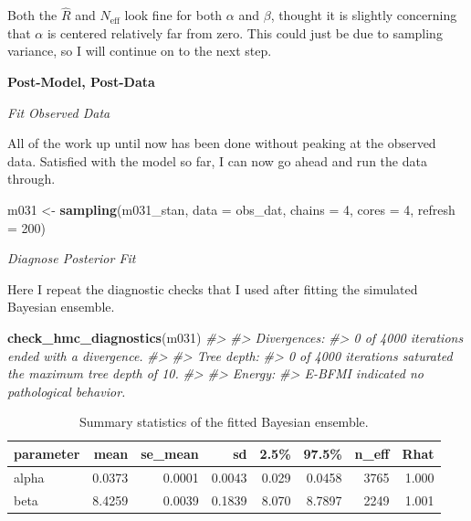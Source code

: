 \documentclass[11pt, oneside, openany]{scrbook}
\newenvironment{Shaded}{\begin{snugshade}}{\end{snugshade}}
\newcommand{\CommentTok}[1]{\textcolor[rgb]{0.56,0.35,0.01}{\textit{#1}}}
\newcommand{\DataTypeTok}[1]{\textcolor[rgb]{0.13,0.29,0.53}{#1}}
\newcommand{\DecValTok}[1]{\textcolor[rgb]{0.00,0.00,0.81}{#1}}
\newcommand{\KeywordTok}[1]{\textcolor[rgb]{0.13,0.29,0.53}{\textbf{#1}}}
\newcommand{\NormalTok}[1]{#1}
\newcommand{\StringTok}[1]{\textcolor[rgb]{0.31,0.60,0.02}{#1}}
\begin{document}
Both the \(\hat{R}\) and \(N_{\mathrm{eff}}\) look fine for both \(\alpha\) and \(\beta\), thought it is slightly concerning that \(\alpha\) is centered relatively far from zero. This could just be due to sampling variance, so I will continue on to the next step.

\textbf{Post-Model, Post-Data}

\emph{Fit Observed Data}

All of the work up until now has been done without peaking at the observed data. Satisfied with the model so far, I can now go ahead and run the data through.


\begin{Shaded}
\begin{Highlighting}[]
\NormalTok{m031 <-}\StringTok{ }\KeywordTok{sampling}\NormalTok{(m031_stan, }\DataTypeTok{data =}\NormalTok{ obs_dat, }
                 \DataTypeTok{chains =} \DecValTok{4}\NormalTok{, }\DataTypeTok{cores =} \DecValTok{4}\NormalTok{, }\DataTypeTok{refresh =} \DecValTok{200}\NormalTok{)}
\end{Highlighting}
\end{Shaded}


\emph{Diagnose Posterior Fit}

Here I repeat the diagnostic checks that I used after fitting the simulated Bayesian ensemble.


\begin{Shaded}
\begin{Highlighting}[]
\KeywordTok{check_hmc_diagnostics}\NormalTok{(m031)}
\CommentTok{#> }
\CommentTok{#> Divergences:}
\CommentTok{#> 0 of 4000 iterations ended with a divergence.}
\CommentTok{#> }
\CommentTok{#> Tree depth:}
\CommentTok{#> 0 of 4000 iterations saturated the maximum tree depth of 10.}
\CommentTok{#> }
\CommentTok{#> Energy:}
\CommentTok{#> E-BFMI indicated no pathological behavior.}
\end{Highlighting}
\end{Shaded}


\begin{table}[!h]

\caption{\label{tab:ch031-Maroon-Oyster}Summary statistics of the fitted Bayesian ensemble.}
\centering
\begin{tabular}[t]{lrrrrrrr}
\toprule
parameter & mean & se\_mean & sd & 2.5\% & 97.5\% & n\_eff & Rhat\\
\midrule
alpha & 0.0373 & 0.0001 & 0.0043 & 0.029 & 0.0458 & 3765 & 1.000\\
beta & 8.4259 & 0.0039 & 0.1839 & 8.070 & 8.7897 & 2249 & 1.001\\
\bottomrule
\end{tabular}
\end{table}
\end{document}
